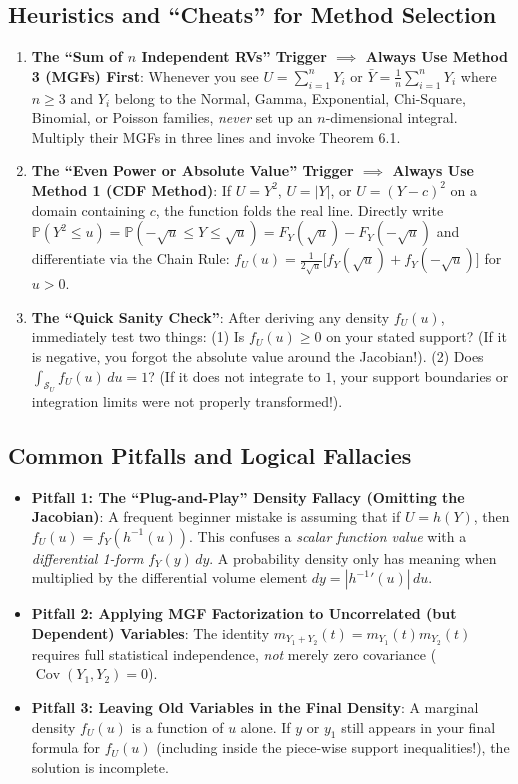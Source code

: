 \documentclass[11pt, letterpaper]{article}
\theoremstyle{definition}
\theoremstyle{remark}
\newcommand{\Prob}{\mathbb{P}}
\begin{document}
\subsection{Heuristics and ``Cheats'' for Method Selection}

\begin{enumerate}[label=\textbf{Heuristic \arabic*:}]
    \item \textbf{The ``Sum of $n$ Independent RVs'' Trigger $\implies$ Always Use Method 3 (MGFs) First}:
    Whenever you see $U = \sum_{i=1}^n Y_i$ or $\bar{Y} = \frac{1}{n}\sum_{i=1}^n Y_i$ where $n \ge 3$ and $Y_i$ belong to the Normal, Gamma, Exponential, Chi-Square, Binomial, or Poisson families, \textit{never} set up an $n$-dimensional integral. Multiply their MGFs in three lines and invoke Theorem 6.1.
    \item \textbf{The ``Even Power or Absolute Value'' Trigger $\implies$ Always Use Method 1 (CDF Method)}:
    If $U = Y^2$, $U = |Y|$, or $U = (Y - c)^2$ on a domain containing $c$, the function folds the real line. Directly write $\Prob(Y^2 \le u) = \Prob(-\sqrt{u} \le Y \le \sqrt{u}) = F_Y(\sqrt{u}) - F_Y(-\sqrt{u})$ and differentiate via the Chain Rule: $f_U(u) = \frac{1}{2\sqrt{u}}\big[f_Y(\sqrt{u}) + f_Y(-\sqrt{u})\big]$ for $u > 0$.
    \item \textbf{The ``Quick Sanity Check''}:
    After deriving any density $f_U(u)$, immediately test two things: (1) Is $f_U(u) \ge 0$ on your stated support? (If it is negative, you forgot the absolute value around the Jacobian!). (2) Does $\int_{\mathcal{S}_U} f_U(u)\,du = 1$? (If it does not integrate to $1$, your support boundaries or integration limits were not properly transformed!).
\end{enumerate}

\subsection{Common Pitfalls and Logical Fallacies}

\begin{itemize}
    \item \textbf{Pitfall 1: The ``Plug-and-Play'' Density Fallacy (Omitting the Jacobian)}:
    A frequent beginner mistake is assuming that if $U = h(Y)$, then $f_U(u) = f_Y(h^{-1}(u))$. This confuses a \textit{scalar function value} with a \textit{differential 1-form} $f_Y(y)\,dy$. A probability density only has meaning when multiplied by the differential volume element $dy = |h^{-1}{'}(u)|\,du$.
    \item \textbf{Pitfall 2: Applying MGF Factorization to Uncorrelated (but Dependent) Variables}:
    The identity $m_{Y_1 + Y_2}(t) = m_{Y_1}(t) m_{Y_2}(t)$ requires full statistical independence, \textit{not} merely zero covariance ($\operatorname{Cov}(Y_1, Y_2) = 0$).
    \item \textbf{Pitfall 3: Leaving Old Variables in the Final Density}:
    A marginal density $f_U(u)$ is a function of $u$ alone. If $y$ or $y_1$ still appears in your final formula for $f_U(u)$ (including inside the piece-wise support inequalities!), the solution is incomplete.
\end{itemize}
\end{document}
